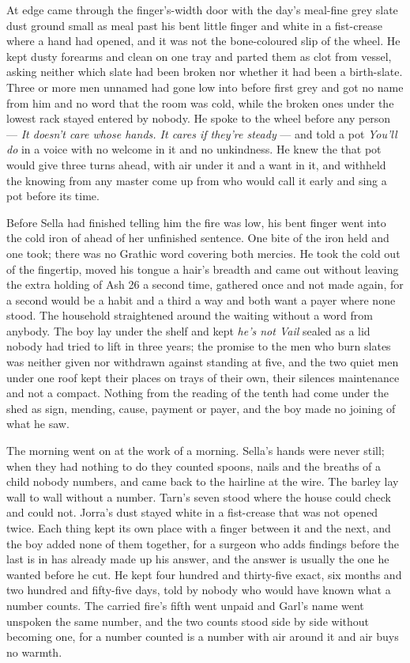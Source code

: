 At  edge  came through the finger's-width door with the day's meal-fine grey slate dust ground small as meal past his bent little finger and white in a fist-crease where a hand had opened, and it was not the bone-coloured slip of the wheel. He kept dusty forearms and clean on one tray and parted them as clot from vessel, asking neither which slate had been broken nor whether it had been a birth-slate. Three or more men unnamed had gone low into  before first grey and got no name from him and no word that the room was cold, while the broken ones under the lowest rack stayed entered by nobody. He spoke to the wheel before any person --- \emph{It doesn't care whose hands. It cares if they're steady} --- and told a pot \emph{You'll do} in a voice with no welcome in it and no unkindness. He knew the  that pot would give three turns ahead, with air under it and a want in it, and withheld the knowing from any master come up from  who would call it early and sing a pot before its time.

Before Sella had finished telling him the fire was low, his bent finger went into the cold iron of  ahead of her unfinished sentence. One bite of the iron held and one took; there was no Grathic word covering both mercies. He took the cold out of the fingertip, moved his tongue a hair's breadth and came out without leaving the extra holding of Ash 26 a second time, gathered once and not made again, for a second would be a habit and a third a way and both want a payer where none stood. The household straightened around the waiting without a word from anybody. The boy lay under the shelf and kept \emph{he's not Vail} sealed as a lid nobody had tried to lift in three years; the promise to the men who burn slates was neither given nor withdrawn against  standing at five, and the two quiet men under one roof kept their places on trays of their own, their silences maintenance and not a compact. Nothing from the reading of the tenth had come under the shed as sign, mending, cause, payment or payer, and the boy made no joining of what he saw.

The morning went on at the work of a morning. Sella's hands were never still; when they had nothing to do they counted spoons, nails and the breaths of a child nobody numbers, and came back to the hairline at the wire. The barley lay wall to wall without a number. Tarn's seven stood where the house could check and could not. Jorra's dust stayed white in a fist-crease that was not opened twice. Each thing kept its own place with a finger between it and the next, and the boy added none of them together, for a surgeon who adds findings before the last is in has already made up his answer, and the answer is usually the one he wanted before he cut. He kept four hundred and thirty-five exact, six months and two hundred and fifty-five days, told by nobody who would have known what a number counts. The carried fire's fifth went unpaid and Garl's name went unspoken the same number, and the two counts stood side by side without becoming one, for a number counted is a number with air around it and air buys no warmth.

